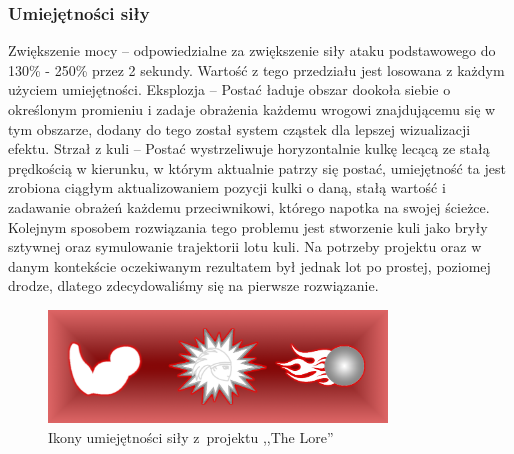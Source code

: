 \documentclass[oneside,polski,logo]{amuthesis}
\begin{document}
\subsubsection{Umiejętności siły}
Zwiększenie mocy – odpowiedzialne za zwiększenie siły ataku podstawowego do 130\% - 250\% przez 2 sekundy. Wartość z tego przedziału jest losowana z każdym użyciem umiejętności.
Eksplozja – Postać ładuje obszar dookoła siebie o określonym promieniu i zadaje obrażenia każdemu wrogowi znajdującemu się w tym obszarze, dodany do tego został system cząstek dla lepszej wizualizacji efektu.
Strzał z kuli – Postać wystrzeliwuje horyzontalnie kulkę lecącą ze stałą prędkością w kierunku, w którym aktualnie patrzy się postać, umiejętność ta jest zrobiona ciągłym aktualizowaniem pozycji kulki o daną, stałą wartość i zadawanie obrażeń każdemu przeciwnikowi, którego napotka na swojej ścieżce. Kolejnym sposobem rozwiązania tego problemu jest stworzenie kuli jako bryły sztywnej oraz symulowanie trajektorii lotu kuli. Na potrzeby projektu oraz w danym kontekście oczekiwanym rezultatem był jednak lot po prostej, poziomej drodze, dlatego zdecydowaliśmy się na pierwsze rozwiązanie.

\begin{figure}[h]
	\centering
	\includegraphics[width=9cm]{images/kozubal/sila.png}
	\caption{Ikony umiejętności siły z~projektu ,,The Lore''}
\end{figure}
\end{document}
